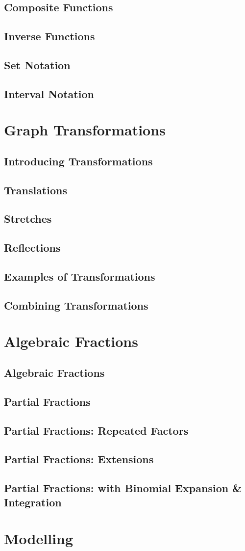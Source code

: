 \documentclass[../alevelmaths.tex]{subfiles}
\begin{document}
\subsection*{Composite Functions}
\subsection*{Inverse Functions}
\subsection*{Set Notation}
\subsection*{Interval Notation}
\section{Graph Transformations}
\subsection*{Introducing Transformations}
\subsection*{Translations}
\subsection*{Stretches}
\subsection*{Reflections}
\subsection*{Examples of Transformations}
\subsection*{Combining Transformations}
\section{Algebraic Fractions}
\subsection*{Algebraic Fractions}
\subsection*{Partial Fractions}
\subsection*{Partial Fractions: Repeated Factors}
\subsection*{Partial Fractions: Extensions}
\subsection*{Partial Fractions: with Binomial Expansion \& Integration}
\section{Modelling}
\end{document}
